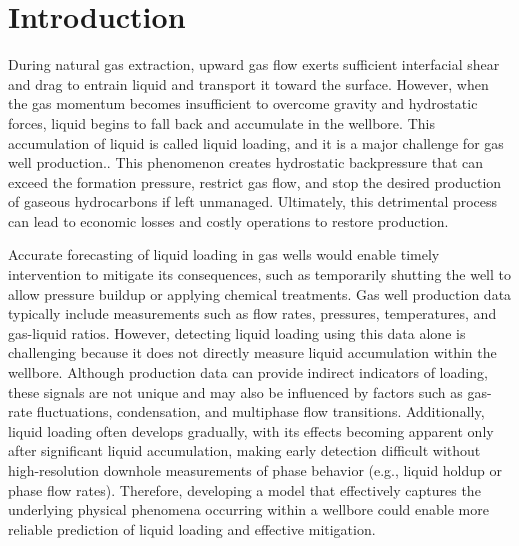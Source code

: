 \documentclass[journal=jacsat,manuscript=article]{achemso}
\theoremstyle{thmstyleone}%
\theoremstyle{thmstyletwo}%
\theoremstyle{thmstylethree}%
\begin{document}



\newpage 

\section{Introduction}\label{intro}

During natural gas extraction, upward gas flow exerts sufficient interfacial shear and drag to entrain liquid and transport it toward the surface. However, when the gas momentum becomes insufficient to overcome gravity and hydrostatic forces, liquid begins to fall back and accumulate in the wellbore. This accumulation of liquid is called liquid loading, and it is a major challenge for gas well production.\cite{CHEN2024205394, riza_pragmatic_2016, CHEN2016178}. This phenomenon creates hydrostatic backpressure that can exceed the formation pressure, restrict gas flow, and stop the desired production of gaseous hydrocarbons if left unmanaged. Ultimately, this detrimental process can lead to economic losses and costly operations to restore production. 

Accurate forecasting of liquid loading in gas wells would enable timely intervention to mitigate its consequences, such as temporarily shutting the well to allow pressure buildup or applying chemical treatments\cite{USEPA2011, Abhulimen}. Gas well production data typically include measurements such as flow rates, pressures, temperatures, and gas-liquid ratios. However, detecting liquid loading using this data alone is challenging because it does not directly measure liquid accumulation within the wellbore. Although production data can provide indirect indicators of loading, these signals are not unique and may also be influenced by factors such as gas-rate fluctuations, condensation, and multiphase flow transitions. Additionally, liquid loading often develops gradually, with its effects becoming apparent only after significant liquid accumulation, making early detection difficult without high-resolution downhole measurements of phase behavior (e.g., liquid holdup or phase flow rates). Therefore, developing a model that effectively captures the underlying physical phenomena occurring within a wellbore could enable more reliable prediction of liquid loading and effective mitigation\cite{Adaze2018, Adriana2019,Makinde2013}.
\end{document}
